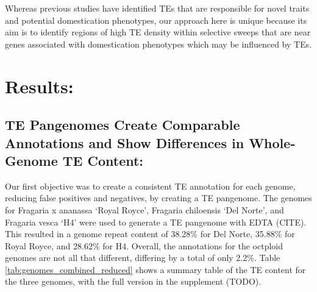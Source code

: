 \documentclass[fleqn,10pt]{olplainarticle}
\begin{document}
Whereas previous studies have identified TEs that are responsible for novel traits and potential domestication phenotypes, our approach here is unique because its aim is to identify regions of high TE density within selective sweeps that are near genes associated with domestication phenotypes which may be influenced by TEs. 



\section{Results:}
\subsection{TE Pangenomes Create Comparable Annotations and Show Differences in Whole-Genome TE Content:}
Our first objective was to create a consistent TE annotation for each genome, reducing false positives and negatives, by creating a TE pangenome.
The genomes for Fragaria x ananassa `Royal Royce', Fragaria chiloensis `Del Norte', and Fragaria vesca `H4' were used to generate a TE pangenome with EDTA (CITE).
This resulted in a genome repeat content of 38.28\% for Del Norte, 35.88\% for Royal Royce, and 28.62\% for H4.
Overall, the annotations for the octploid genomes are not all that different, differing by a total of only 2.2\%.
Table \ref{tab:genomes_combined_reduced} shows a summary table of the TE content for the three genomes, with the full version in the supplement (TODO).
\end{document}
